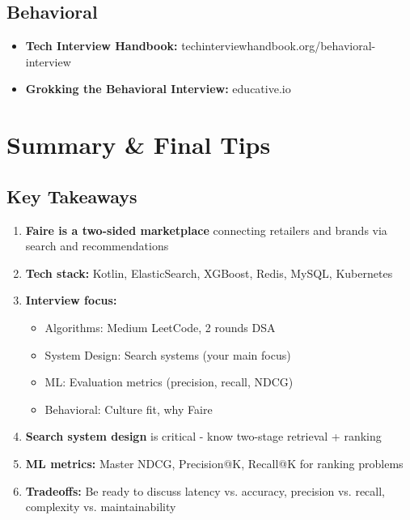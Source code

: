 \documentclass[11pt,letterpaper]{article}
\begin{document}
\subsection{Behavioral}

\begin{itemize}
    \item \textbf{Tech Interview Handbook:} techinterviewhandbook.org/behavioral-interview
    \item \textbf{Grokking the Behavioral Interview:} educative.io
\end{itemize}

\section{Summary \& Final Tips}

\subsection{Key Takeaways}

\begin{enumerate}
    \item \textbf{Faire is a two-sided marketplace} connecting retailers and brands via search and recommendations

    \item \textbf{Tech stack:} Kotlin, ElasticSearch, XGBoost, Redis, MySQL, Kubernetes

    \item \textbf{Interview focus:}
    \begin{itemize}
        \item Algorithms: Medium LeetCode, 2 rounds DSA
        \item System Design: Search systems (your main focus)
        \item ML: Evaluation metrics (precision, recall, NDCG)
        \item Behavioral: Culture fit, why Faire
    \end{itemize}

    \item \textbf{Search system design} is critical - know two-stage retrieval + ranking

    \item \textbf{ML metrics:} Master NDCG, Precision@K, Recall@K for ranking problems

    \item \textbf{Tradeoffs:} Be ready to discuss latency vs. accuracy, precision vs. recall, complexity vs. maintainability
\end{enumerate}
\end{document}
